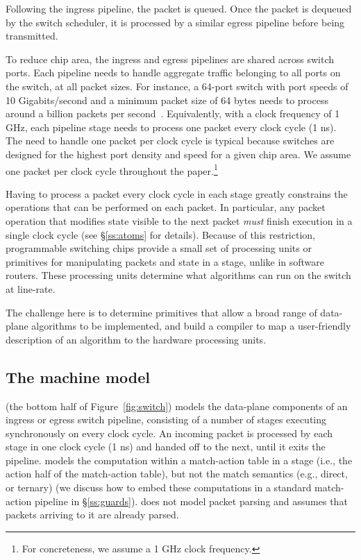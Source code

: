 Following the ingress pipeline, the packet is queued. Once the packet
is dequeued by the switch scheduler, it is processed by a similar
egress pipeline before being transmitted.

To reduce chip area, the ingress and egress pipelines are shared
across switch ports.  Each pipeline needs to handle aggregate traffic
belonging to all ports on the switch, at all packet sizes.  For
instance, a 64-port switch with port speeds of 10 Gigabits/second and
a minimum packet size of 64 bytes needs to process around a billion
packets per second~\cite{rmt}.  Equivalently, with a clock frequency
of 1 GHz, each pipeline stage needs to process one packet every clock
cycle (1 ns).  The need to handle one packet per clock cycle is
typical because switches are designed for the highest port density and
speed for a given chip area. We assume one packet per clock
cycle throughout the paper.\footnote{For concreteness, we assume a 1
  GHz clock frequency.}

Having to process a packet every clock cycle in each stage greatly
constrains the operations that can be performed on each packet. In
particular, any packet operation that modifies state visible to the
next packet {\em must} finish execution in a single clock cycle (see
\S\ref{ss:atoms} for details). Because of this restriction,
programmable switching chips provide a small set of processing units
or primitives for manipulating packets and state in a stage, unlike in
software routers. These processing units determine what algorithms can
run on the switch at line-rate.

The challenge here is to determine primitives that allow a broad range
of data-plane algorithms to be implemented, and build a compiler to
map a user-friendly description of an algorithm to the hardware
processing units.


\subsection{The \absmachine machine model}

\absmachine (the bottom half of Figure~\ref{fig:switch}) models the
data-plane components of an ingress or egress switch pipeline,
consisting of a number of stages executing synchronously on every
clock cycle. An incoming packet is processed by each stage in one
clock cycle (1 ns) and handed off to the next, until it exits the
pipeline. \absmachine models the computation within a match-action
table in a stage (i.e., the action half of the match-action table),
but not the match semantics (e.g., direct, or ternary) (we discuss how
to embed these computations in a standard match-action pipeline in
\S\ref{ss:guards}). \absmachine does not model packet parsing and
assumes that packets arriving to it are already parsed.

